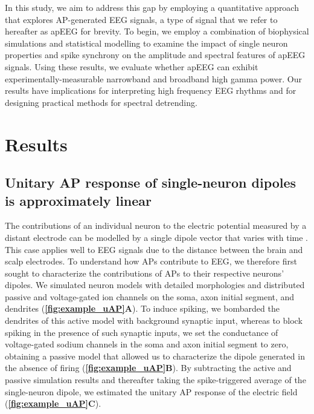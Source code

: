 In this study, we aim to address this gap by employing a quantitative approach that explores AP-generated EEG signals, a type of signal that we refer to hereafter as apEEG for brevity. To begin, we employ a combination of biophysical simulations and statistical modelling to examine the impact of single neuron properties and spike synchrony on the amplitude and spectral features of apEEG signals. Using these results, we evaluate whether apEEG can exhibit experimentally-measurable narrowband and broadband high gamma power. Our results have implications for interpreting high frequency EEG rhythms and for designing practical methods for spectral detrending.

\section{Results}

\subsection{Unitary AP response of single-neuron dipoles is approximately linear}

The contributions of an individual neuron to the electric potential measured by a distant electrode can be modelled by a single dipole vector that varies with time \cite{Næss2021, Murakami2006}. This case applies well to EEG signals due to the distance between the brain and scalp electrodes. To understand how APs contribute to EEG, we therefore first sought to characterize the contributions of APs to their respective neurons' dipoles. We simulated neuron models with detailed morphologies and distributed passive and voltage-gated ion channels on the soma, axon initial segment, and dendrites (\textbf{\autoref{fig:example_uAP}A}). To induce spiking, we bombarded the dendrites of this active model with background synaptic input, whereas to block spiking in the presence of such synaptic inputs, we set the conductance of voltage-gated sodium channels in the soma and axon initial segment to zero, obtaining a passive model that allowed us to characterize the dipole generated in the absence of firing ({\color{seccolor}\textbf{\autoref{fig:example_uAP}B}}). By subtracting the active and passive simulation results and thereafter taking the spike-triggered average of the single-neuron dipole, we estimated the unitary AP response of the electric field (\textbf{\autoref{fig:example_uAP}C}).

